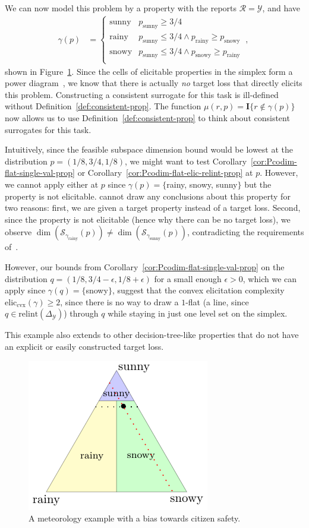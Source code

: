 \documentclass[anon,12pt]{colt2021} %
\newcommand{\simplex}{\Delta_\Y}
\newcommand{\relint}[1]{\mathrm{relint}(#1)}
\newcommand{\eliccvx}{\mathrm{elic}_\mathrm{cvx}}
\newcommand{\propdis}{\mu}
\newcommand{\R}{\mathcal{R}}
\newcommand{\Sc}{\mathcal{S}}  %
\newcommand{\Y}{\mathcal{Y}}
\newcommand{\Ind}[1]{\mathbf{I}\{{#1}\}}
\begin{document}
We can now model this problem by a property with the reports $\R = \Y$, and have 
\begin{align*}
\gamma(p) &= \begin{cases}
\text{sunny} & p_{\text{sunny}} \geq 3/4 \\
\text{rainy} & p_{\text{sunny}} \leq 3/4 \wedge p_{\text{rainy}} \geq p_{\text{snowy}} \\
\text{snowy} & p_{\text{sunny}} \leq 3/4 \wedge p_{\text{snowy}} \geq p_{\text{rainy}} \\
\end{cases}~,~
\end{align*} 
shown in Figure~\ref{fig:t-example}.
Since the cells of elicitable properties in the simplex form a power diagram~\citep{lambert2009eliciting}, we know that there is actually \emph{no} target loss that directly elicits this problem.
Constructing a consistent surrogate for this task is ill-defined without Definition~\ref{def:consistent-prop}.
The function $\propdis(r,p) = \Ind{r \not \in \gamma(p)}$ 
now allows us to use Definition~\ref{def:consistent-prop} to think about consistent surrogates for this task.

Intuitively, since the feasible subspace dimension bound would be lowest at the distribution $p = (1/8, 3/4,1/8)$, we might want to test Corollary~\ref{cor:Pcodim-flat-single-val-prop} or Corollary~\ref{cor:Pcodim-flat-elic-relint-prop} at $p$.
However, we cannot apply either at $p$ since $\gamma(p) = \{$rainy, snowy, sunny$\}$ but the property is not elicitable.
\citet[Theorem 16]{ramaswamy2016convex} cannot draw any conclusions about this property for two reasons: first, we are given a target property instead of a target loss.
Second, since the property is not elicitable (hence why there can be no target loss), we observe $\dim(\Sc_{\gamma_{\text{rainy}}}(p)) \neq \dim(\Sc_{\gamma_{\text{sunny}}}(p))$, contradicting the requirements of~\citet[Lemma 23]{ramaswamy2016convex}.

However, our bounds from Corollary~\ref{cor:Pcodim-flat-single-val-prop} on the distribution $q = (1/8, 3/4 - \epsilon, 1/8 + \epsilon)$ for a small enough $\epsilon > 0$, which we can apply since $\gamma(q) = \{$snowy$\}$, suggest that the convex elicitation complexity $\eliccvx(\gamma) \geq 2$, since there is no way to draw a $1$-flat (a line, since $q \in \relint{\simplex}$) through $q$ while staying in just one level set on the simplex.


This example also extends to other decision-tree-like properties that do not have an explicit or easily constructed target loss.
\begin{figure}
	\centering
	\includegraphics[width=0.3\linewidth]{tikz/t-example.pdf}
	\caption{A meteorology example with a bias towards citizen safety.}
	\label{fig:t-example}
\end{figure}
\end{document}
